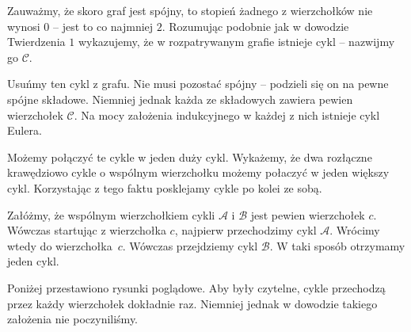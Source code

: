 \noindent
Zauważmy, że skoro graf jest spójny, to stopień żadnego z wierzchołków nie wynosi $0$ -- jest to co najmniej $2$. Rozumując podobnie jak w dowodzie Twierdzenia $1$ wykazujemy, że w rozpatrywanym grafie istnieje cykl -- nazwijmy go $\mathcal{C}$.

\vspace{5px}

\noindent
Usuńmy ten cykl z grafu. Nie musi pozostać spójny -- podzieli się on na pewne spójne składowe. Niemniej jednak każda ze składowych zawiera pewien wierzchołek $\mathcal{C}$. Na mocy założenia indukcyjnego w każdej z nich istnieje cykl Eulera. 

\vspace{5px}

\noindent
Możemy połączyć te cykle w jeden duży cykl. Wykażemy, że dwa rozłączne krawędziowo cykle o wspólnym wierzchołku możemy połaczyć w jeden większy cykl. Korzystając z tego faktu posklejamy cykle po kolei ze sobą.

\vspace{5px}

\noindent
Załóżmy, że wspólnym wierzchołkiem cykli $\mathcal{A}$ i $\mathcal{B}$ jest pewien wierzchołek $c$. Wówczas startując z wierzchołka $c$, najpierw przechodzimy cykl $\mathcal{A}$. Wrócimy wtedy do wierzchołka~$c$. Wówczas przejdziemy cykl $\mathcal{B}$. W taki sposób otrzymamy jeden cykl.

\vspace{5px}

\noindent
Poniżej przestawiono rysunki poglądowe. Aby były czytelne, cykle przechodzą przez każdy wierzchołek dokładnie raz. Niemniej jednak w dowodzie takiego założenia nie poczyniliśmy.

